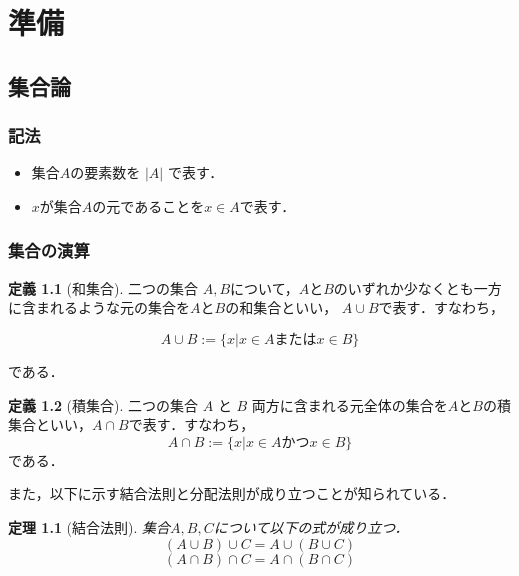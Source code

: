 \documentclass[11pt]{jsreport}
\theoremstyle{plain} %
\newtheorem{theorem}{定理}
\theoremstyle{definition}
\newtheorem{definition}{定義}
\begin{document}
\chapter{準備}

\section{集合論}
\subsection{記法}

\begin{itemize}
    \item 集合$A$の要素数を $|A|$ で表す．
    \item $x$が集合$A$の元であることを$x \in A$で表す．
\end{itemize}

\subsection{集合の演算}

\begin{definition}[和集合]
    二つの集合 $A, B$について，$A$と$B$のいずれか少なくとも一方に含まれるような元の集合を$A$と$B$の和集合といい， $A \cup B$で表す．すなわち，

    \begin{equation}
        A \cup B := \{x | x \in A または x \in B \}
    \end{equation}

    である．

\end{definition}

\begin{definition}[積集合]
    二つの集合 $A$ と $B$ 両方に含まれる元全体の集合を$A$と$B$の積集合といい，$A \cap B$で表す．すなわち，
    \begin{equation}
        A \cap B := \{x | x \in A かつ x \in B \}
    \end{equation}
    である．
\end{definition}

また，以下に示す結合法則と分配法則が成り立つことが知られている．
\begin{theorem}[結合法則]  集合$A, B, C$について以下の式が成り立つ．
    \begin{equation}
        (A \cup B) \cup C = A \cup (B \cup C)
    \end{equation}
    \begin{equation}
        (A \cap B) \cap C = A \cap (B \cap C)
    \end{equation}
\end{theorem}
\end{document}
